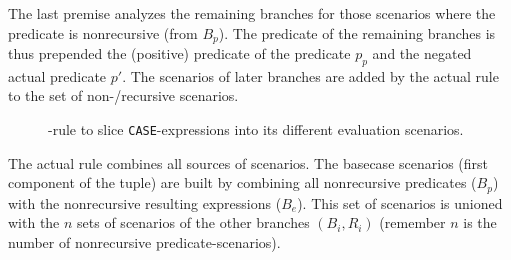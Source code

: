 The last premise analyzes the remaining branches for those scenarios where the predicate is nonrecursive (from $B_p$). The predicate of the remaining branches is thus prepended the (positive) predicate of the predicate $p_p$ and the negated actual predicate $p'$. The scenarios of later branches are added by the actual rule to the set of non-/recursive scenarios.

\begin{figure}[h!]
    \centering\small

    \caption{\RWHEN-rule to slice \texttt{CASE}-expressions into its different evaluation scenarios.}
    \label{fig:my_label}
\end{figure}

The actual rule combines all sources of scenarios. The basecase scenarios (first component of the tuple) are built by combining all nonrecursive predicates ($B_p$) with the nonrecursive resulting expressions ($B_e$). This set of scenarios is unioned with the $n$ sets of scenarios of the other branches $(B_i, R_i)$ (remember $n$ is the number of nonrecursive predicate-scenarios).

